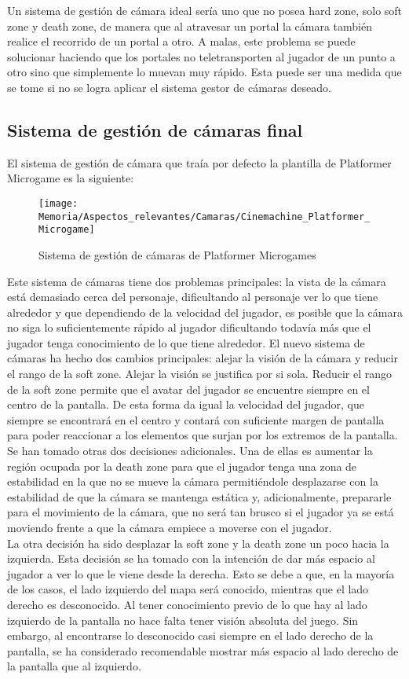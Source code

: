 Un sistema de gestión de cámara ideal sería uno que no posea hard zone, solo soft zone y death zone, de manera que al atravesar un portal la cámara también realice el recorrido de un portal a otro. A malas, este problema se puede solucionar haciendo que los portales no teletransporten al jugador de un punto a otro sino que simplemente lo muevan muy rápido. Esta puede ser una medida que se tome si no se logra aplicar el sistema gestor de cámaras deseado.

\subsection{Sistema de gestión de cámaras final}
El sistema de gestión de cámara que traía por defecto la plantilla de Platformer Microgame es la siguiente:

\clearpage
\begin{figure}[h]
\texttt{[image: Memoria/Aspectos\_relevantes/Camaras/Cinemachine\_Platformer\_Microgame]}
\caption{Sistema de gestión de cámaras de Platformer Microgames}
\end{figure}

Este sistema de cámaras tiene dos problemas principales: la vista de la cámara está demasiado cerca del personaje, dificultando al personaje ver lo que tiene alrededor y que dependiendo de la velocidad del jugador, es posible que la cámara no siga lo suficientemente rápido al jugador dificultando todavía más que el jugador tenga conocimiento de lo que tiene alrededor. El nuevo sistema de cámaras ha hecho dos cambios principales: alejar la visión de la cámara y reducir el rango de la soft zone. Alejar la visión se justifica por si sola. Reducir el rango de la soft zone permite que el avatar del jugador se encuentre siempre en el centro de la pantalla. De esta forma da igual la velocidad del jugador, que siempre se encontrará en el centro y contará con suficiente margen de pantalla para poder reaccionar a los elementos que surjan por los extremos de la pantalla.\\
Se han tomado otras dos decisiones adicionales. Una de ellas es aumentar la región ocupada por la death zone para que el jugador tenga una zona de estabilidad en la que no se mueve la cámara permitiéndole desplazarse con la estabilidad de que la cámara se mantenga estática y, adicionalmente, prepararle para el movimiento de la cámara, que no será tan brusco si el jugador ya se está moviendo frente a que la cámara empiece a moverse con el jugador.\\
La otra decisión ha sido desplazar la soft zone y la death zone un poco hacia la izquierda. Esta decisión se ha tomado con la intención de dar más espacio al jugador a ver lo que le viene desde la derecha. Esto se debe a que, en la mayoría de los casos, el lado izquierdo del mapa será conocido, mientras que el lado derecho es desconocido. Al tener conocimiento previo de lo que hay al lado izquierdo de la pantalla no hace falta tener visión absoluta del juego. Sin embargo, al encontrarse lo desconocido casi siempre en el lado derecho de la pantalla, se ha considerado recomendable mostrar más espacio al lado derecho de la pantalla que al izquierdo.

